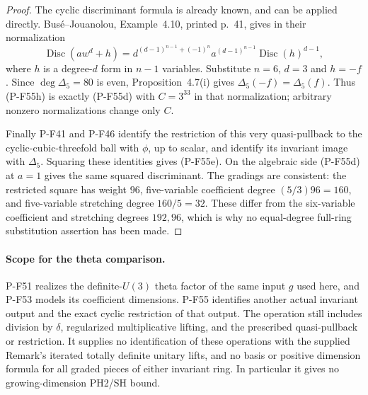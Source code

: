 \begin{proof}
The cyclic discriminant formula is already known, and can
be applied directly. Bus\'e--Jouanolou, Example~4.10,
printed p.~41, gives in their normalization
\[
 \operatorname{Disc}(a w^d+h)
   =d^{(d-1)^{n-1}+(-1)^n}
       a^{(d-1)^{n-1}}\operatorname{Disc}(h)^{d-1},
 \tag{P-F55h}
\]
where $h$ is a degree-$d$ form in $n-1$ variables.
Substitute $n=6$, $d=3$ and $h=-f$.
Since $\deg\Delta_5=80$ is even, Proposition~4.7(i)
gives $\Delta_5(-f)=\Delta_5(f)$. Thus (P-F55h)
is exactly (P-F55d) with $C=3^{33}$ in that normalization;
arbitrary nonzero normalizations change only $C$.

Finally P-F41 and P-F46 identify the restriction of this very
quasi-pullback to the cyclic-cubic-threefold ball with $\phi$,
up to scalar, and identify its invariant image with $\Delta_5$.
Squaring these identities gives (P-F55e). On the algebraic
side (P-F55d) at $a=1$ gives the same squared discriminant.
The gradings are consistent: the restricted square has weight
$96$, five-variable coefficient degree $(5/3)96=160$, and
five-variable stretching degree $160/5=32$.
These differ from the six-variable coefficient and stretching
degrees $192,96$, which is why no equal-degree full-ring
substitution assertion has been made.
\end{proof}

\paragraph{Scope for the theta comparison.}
P-F51 realizes the definite-$U(3)$ theta factor of the same
input $g$ used here, and P-F53 models its coefficient dimensions.
P-F55 identifies another actual invariant output and the exact
cyclic restriction of that output. The operation still includes
division by $\delta$, regularized multiplicative lifting, and
the prescribed quasi-pullback or restriction. It supplies no
identification of these operations with the supplied Remark's
iterated totally definite unitary lifts, and no basis or positive
dimension formula for all graded pieces of either invariant
ring. In particular it gives no growing-dimension PH2/SH bound.
